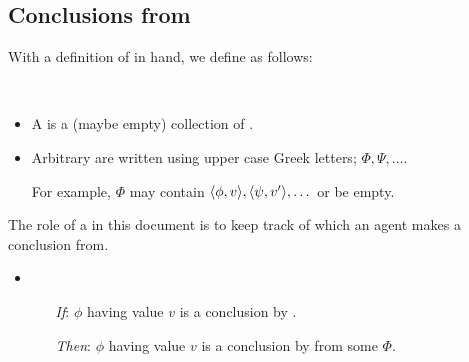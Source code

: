 \subsection{Conclusions from }
\label{sec:pools-premises}

\begin{note}
  With a definition of  in hand, we define  as follows:

  \begin{definition}[\pool{3}]
    \label{def:pools}
    \mbox{ }
    \vspace{-\baselineskip}
    \begin{itemize}
    \item
      A \emph{\pool{}} is a (maybe empty) collection of .
    \end{itemize}
    \vspace{-\baselineskip}
  \end{definition}

  \begin{itemize}[leftmargin=*]
  \item
    Arbitrary  are written using upper case Greek letters; \(\Phi, \Psi, \dots\).

    For example, \(\Phi\) may contain \(\langle \phi, v \rangle, \langle \psi, v' \rangle, \dots\) or be empty.
  \end{itemize}

  The role of a \pool{} in this document is to keep track of which  an agent makes a conclusion from.

  \begin{assumption}
    \label{assu:concluding:pools}
    \begin{itemize}[noitemsep]
    \item
      \begin{enumerate}
      \item[\emph{If}:]
        \(\phi\) having value \(v\) is a conclusion by \vAgent{}.
      \item[\emph{Then}:]
        \(\phi\) having value \(v\) is a conclusion by \vAgent{} from some \pool{} \(\Phi\).
      \end{enumerate}
    \end{itemize}
    \vspace{-\baselineskip}
  \end{assumption}


\end{note}
